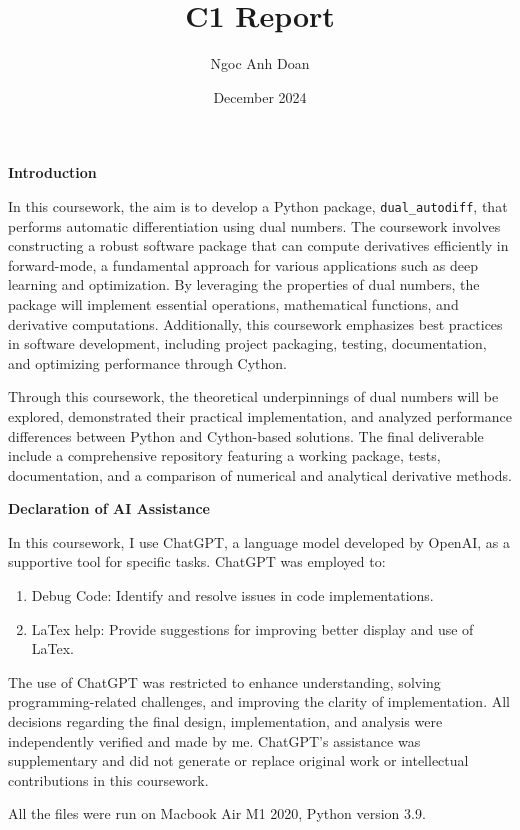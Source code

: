 \documentclass[12.5pt]{article}
\title{C1 Report}
\author{Ngoc Anh Doan}
\date{December 2024}
\begin{document}
\maketitle
\newpage
\begin{center}
    \textbf{Introduction}
\end{center}
In this coursework, the aim is to develop a Python package, \texttt{dual\_autodiff}, that performs automatic differentiation using dual numbers. The coursework involves constructing a robust software package that can compute derivatives efficiently in forward-mode, a fundamental approach for various applications such as deep learning and optimization. By leveraging the properties of dual numbers, the package will implement essential operations, mathematical functions, and derivative computations. Additionally, this coursework emphasizes best practices in software development, including project packaging, testing, documentation, and optimizing performance through Cython.

Through this coursework, the theoretical underpinnings of dual numbers will be explored, demonstrated their practical implementation, and analyzed performance differences between Python and Cython-based solutions. The final deliverable include a comprehensive repository featuring a working package, tests, documentation, and a comparison of numerical and analytical derivative methods.

\begin{center}
\textbf{Declaration of AI Assistance}
\end{center}
In this coursework, I use ChatGPT, a language model developed by OpenAI, as a supportive tool for specific tasks. ChatGPT was employed to:
\begin{enumerate}
    \item Debug Code: Identify and resolve issues in code implementations.
    \item LaTex help: Provide suggestions for improving better display and use of LaTex.
\end{enumerate}

The use of ChatGPT was restricted to enhance understanding, solving programming-related challenges, and improving the clarity of implementation. All decisions regarding the final design, implementation, and analysis were independently verified and made by me. ChatGPT's assistance was supplementary and did not generate or replace original work or intellectual contributions in this coursework.

All the files were run on Macbook Air M1 2020, Python version 3.9.
\end{document}
